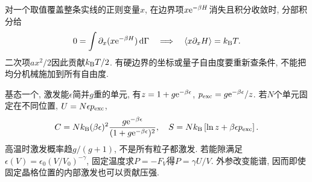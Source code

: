 对一个取值覆盖整条实线的正则变量$x$, 在边界项$x\mathrm e^{-\beta H}$消失且积分收敛时, 分部积分给
\[
0=\int\partial_x(x\mathrm e^{-\beta H})\,\mathrm d\Gamma
\quad\Longrightarrow\quad\langle x\partial_xH\rangle=k_{\mathrm B} T.
\]
二次项$a x^2/2$因此贡献$k_{\mathrm B} T/2$. 有硬边界的坐标或量子自由度要重新查条件, 不能把均分机械施加到所有自由度.

基态一个, 激发能$\epsilon$简并$g$重的单元, 有$z=1+g\mathrm e^{-\beta\epsilon}$, $p_{\rm exc}=g\mathrm e^{-\beta\epsilon}/z$. 若$N$个单元固定在不同位置, $U=N\epsilon p_{\rm exc}$,
\[
C=Nk_{\mathrm B}(\beta\epsilon)^2\frac{g\mathrm e^{-\beta\epsilon}}{(1+g\mathrm e^{-\beta\epsilon})^2},\quad
S=Nk_{\mathrm B}\left[\ln z+\beta\epsilon p_{\rm exc}\right].
\]
高温时激发概率趋$g/(g+1)$, 不是所有粒子都激发. 若能隙满足$\epsilon(V)=\epsilon_0(V/V_0)^{-\gamma}$, 固定温度求$P=-F_V$得$P=\gamma U/V$. 外参改变能谱, 因而即使固定晶格位置的内部激发也可以贡献压强.
